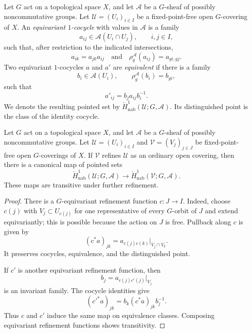 \begin{definition}
\label{definition-nonabelian-equivariant-cech-h1-cover}
Let $G$ act on a topological space $X$, and let $\mathcal A$ be a
$G$-sheaf of possibly noncommutative groups. Let
$\mathcal U = (U_i)_{i \in I}$ be a fixed-point-free open $G$-covering
of $X$. An {\it equivariant $1$-cocycle} with values in $\mathcal A$ is
a family
$$
a_{ij} \in \mathcal A(U_i \cap U_j), \qquad i, j \in I,
$$
such that, after restriction to the indicated intersections,
$$
a_{ik} = a_{jk}a_{ij}
\quad\text{and}\quad
\rho_g^{\mathcal A}(a_{ij}) = a_{gi,gj}.
$$
Two equivariant $1$-cocycles $a$ and $a'$ are {\it equivalent} if there
is a family
$$
b_i \in \mathcal A(U_i),
\qquad
\rho_g^{\mathcal A}(b_i) = b_{gi},
$$
such that
$$
a'_{ij} = b_j a_{ij}b_i^{-1}.
$$
We denote the resulting pointed set by
$\check H^1_{\mathrm{nab}}(\mathcal U;G,\mathcal A)$. Its distinguished
point is the class of the identity cocycle.
\end{definition}

\begin{lemma}
\label{lemma-nonabelian-equivariant-cech-refinements}
Let $G$ act on a topological space $X$, and let $\mathcal A$ be a
$G$-sheaf of possibly noncommutative groups. Let
$\mathcal U=(U_i)_{i\in I}$ and $\mathcal V=(V_j)_{j\in J}$ be
fixed-point-free open $G$-coverings of $X$. If $\mathcal V$ refines
$\mathcal U$ as an ordinary open covering, then there is a canonical map
of pointed sets
$$
\check H^1_{\mathrm{nab}}(\mathcal U;G,\mathcal A)
\longrightarrow
\check H^1_{\mathrm{nab}}(\mathcal V;G,\mathcal A).
$$
These maps are transitive under further refinement.
\end{lemma}

\begin{proof}
There is a $G$-equivariant refinement function $c:J\to I$. Indeed,
choose $c(j)$ with $V_j\subset U_{c(j)}$ for one representative of
every $G$-orbit of $J$ and extend equivariantly; this is possible because
the action on $J$ is free. Pullback along $c$ is given by
$$
(c^*a)_{jk}=
a_{c(j)c(k)}|_{V_j\cap V_k}.
$$
It preserves cocycles, equivalence, and the distinguished point.

If $c'$ is another equivariant refinement function, then
$$
b_j=a_{c(j)c'(j)}|_{V_j}
$$
is an invariant family. The cocycle identities give
$$
(c'^*a)_{jk}=b_k(c^*a)_{jk}b_j^{-1}.
$$
Thus $c$ and $c'$ induce the same map on equivalence classes.
Composing equivariant refinement functions shows transitivity.
\end{proof}


